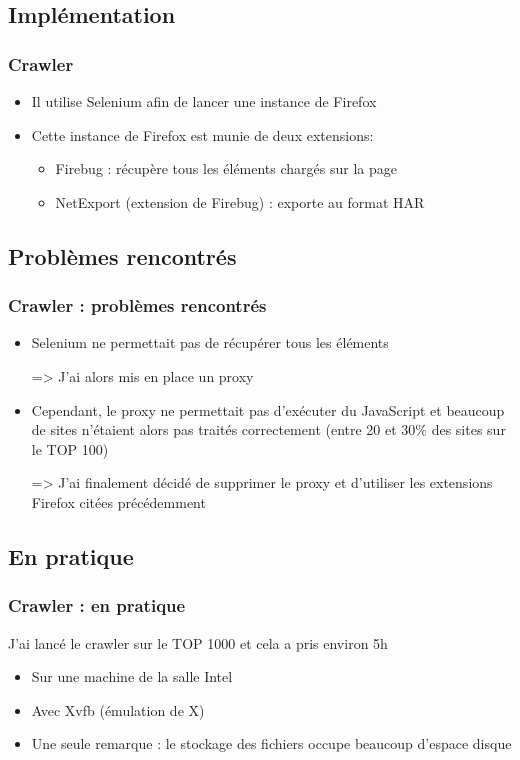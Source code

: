 \documentclass[compress]{beamer}
\begin{document}
  \subsection{Implémentation}
  \begin{frame}
  \frametitle{Crawler}
    \begin{itemize}
      \item Il utilise Selenium afin de lancer une instance de Firefox
      \item Cette instance de Firefox est munie de deux extensions:
        \begin{itemize}
          \item Firebug : récupère tous les éléments chargés sur la page
          \item NetExport (extension de Firebug) : exporte au format HAR
        \end{itemize}
    \end{itemize}
  \end{frame}
  
  \subsection{Problèmes rencontrés}
  \begin{frame}
  \frametitle{Crawler : problèmes rencontrés}
    \begin{itemize}
      \item Selenium ne permettait pas de récupérer tous les éléments
      
      => J'ai alors mis en place un proxy
      \item Cependant, le proxy ne permettait pas d'exécuter du JavaScript et beaucoup de sites n'étaient alors pas traités correctement (entre 20 et 30\% des sites sur le TOP 100)
      
      => J'ai finalement décidé de supprimer le proxy et d'utiliser les extensions Firefox citées précédemment
    \end{itemize}
  \end{frame}
  
  \subsection{En pratique}
  \begin{frame}
  \frametitle{Crawler : en pratique}
  J'ai lancé le crawler sur le TOP 1000 et cela a pris environ 5h
    \begin{itemize}
    \item Sur une machine de la salle Intel
    \item Avec Xvfb (émulation de X)
    \item Une seule remarque : le stockage des fichiers occupe beaucoup d'espace disque
    \end{itemize}
  \end{frame}
  
\end{document}
